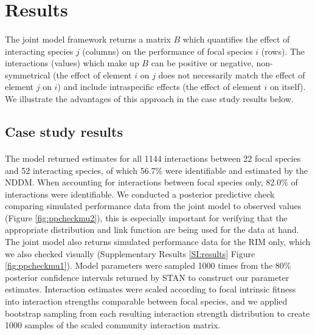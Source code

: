 \documentclass[a4,12pt]{article}
\begin{document}
\section{Results}
    
    \paragraph{}
    The joint model framework returns a matrix $B$ which quantifies the effect of interacting species $j$ (columns) on the performance of focal species $i$ (rows). The interactions (values) which make up $B$ can be positive or negative, non-symmetrical (the effect of element $i$ on $j$ does not necessarily match the effect of element $j$ on $i$) and include intraspecific effects (the effect of element $i$ on itself). We illustrate the advantages of this approach in the case study results below. 


    \subsection{Case study results}

    \paragraph{}
    The model returned estimates for all 1144 interactions between 22 focal species and 52 interacting species, of which 56.7\% were identifiable and estimated by the NDDM.  When accounting for interactions between focal species only, 82.0\% of interactions were identifiable. We conducted a posterior predictive check comparing simulated performance data from the joint model to observed values (Figure \ref{fig:ppcheckmu2}), this is especially important for verifying that the appropriate distribution and link function are being used for the data at hand. The joint model also returns simulated performance data for the RIM only, which we also checked visually (Supplementary Results \ref{SI:results} Figure \ref{fig:ppcheckmu1}). Model parameters were sampled 1000 times from the 80\% posterior confidence intervals returned by STAN to construct our parameter estimates. Interaction estimates were scaled according to focal intrinsic fitness into interaction strengths comparable between focal species, and we applied bootstrap sampling from each resulting interaction strength distribution to create 1000 samples of the scaled community interaction matrix.
\end{document}
